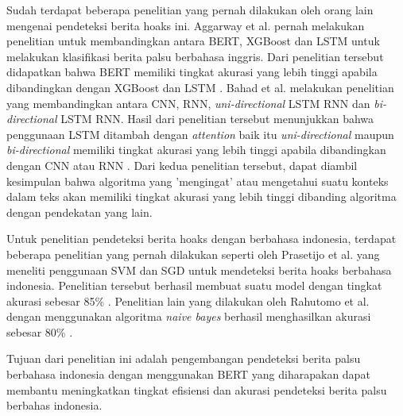 Sudah terdapat beberapa penelitian yang pernah dilakukan oleh orang lain mengenai pendeteksi berita hoaks ini. Aggarway et al. pernah melakukan penelitian untuk membandingkan antara BERT, XGBoost dan LSTM untuk melakukan klasifikasi berita palsu berbahasa inggris. Dari penelitian tersebut didapatkan bahwa BERT memiliki tingkat akurasi yang lebih tinggi apabila dibandingkan dengan XGBoost dan LSTM \cite{bert_news_classi}. Bahad et al. melakukan penelitian yang membandingkan antara CNN, RNN, \textit{uni-directional} LSTM RNN dan \textit{bi-directional} LSTM RNN. Hasil dari penelitian tersebut menunjukkan bahwa penggunaan LSTM ditambah dengan \textit{attention} baik itu \textit{uni-directional} maupun \textit{bi-directional} memiliki tingkat akurasi yang lebih tinggi apabila dibandingkan dengan CNN atau RNN \cite{bahad_lstm}. Dari kedua penelitian tersebut, dapat diambil kesimpulan bahwa algoritma yang 'mengingat' atau mengetahui suatu konteks dalam teks akan memiliki tingkat akurasi yang lebih tinggi dibanding algoritma dengan pendekatan yang lain.

Untuk penelitian pendeteksi berita hoaks dengan berbahasa indonesia, terdapat beberapa penelitian yang pernah dilakukan seperti oleh Prasetijo et al. yang meneliti penggunaan SVM dan SGD untuk mendeteksi berita hoaks berbahasa indonesia. Penelitian tersebut berhasil membuat suatu model dengan tingkat akurasi sebesar 85\% \cite{prasetijo}. Penelitian lain yang dilakukan oleh Rahutomo et al. dengan menggunakan algoritma \textit{naive bayes} berhasil menghasilkan akurasi sebesar 80\% \cite{rahutomo}.

Tujuan dari penelitian ini adalah pengembangan pendeteksi berita palsu berbahasa indonesia dengan menggunakan BERT yang diharapakan dapat membantu meningkatkan tingkat efisiensi dan akurasi pendeteksi berita palsu berbahas indonesia.
